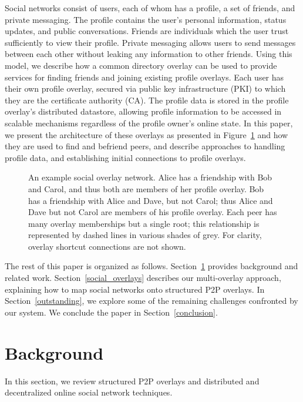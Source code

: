 \documentclass[letterpaper,twocolumn,10pt]{article}
\begin{document}
Social networks consist of users, each of whom has a profile, a set
of friends, and private messaging.  The profile contains the user's
personal information, status updates, and public conversations.  Friends are
individuals which the user trust sufficiently to view their profile.  Private
messaging allows users to send messages between each other without leaking any
information to other friends.  Using this model, we describe how a common
directory overlay can be used to provide services for finding friends and
joining existing profile overlays.  Each user has their own profile overlay,
secured via public key infrastructure (PKI) to which they are the certificate
authority (CA).  The profile data is stored in the profile overlay's distributed
datastore, allowing profile information to be accessed in scalable mechanisms
regardless of the profile owner's online state.  In this paper, we present
the architecture of these overlays as presented in Figure~\ref{fig:system} and
how they are used to find and befriend peers, and describe approaches to
handling profile data, and establishing initial connections to profile overlays.

\begin{figure}[ht]
\centering
{}
\caption{An example social overlay network.  Alice has a friendship with Bob and
Carol, and thus both are members of her profile overlay. Bob has a 
friendship with Alice and Dave, but not Carol; thus Alice and Dave but not Carol
are members of his profile overlay.  Each peer has many overlay memberships
but a single root; this relationship is represented by dashed lines in various
shades of grey.  For clarity, overlay shortcut connections are not shown.}
\label{fig:system}
\end{figure}

The rest of this paper is organized as follows.  Section~\ref{background}
provides background and related work.  Section~\ref{social_overlays} describes
our multi-overlay approach, explaining how to map social networks onto structured
P2P overlays.  In Section~\ref{outstanding}, we explore some of the remaining
challenges confronted by our system.  We conclude the paper in
Section~\ref{conclusion}.

\section{Background}
\label{background}
In this section, we review structured P2P overlays and distributed and
decentralized online social network techniques.
\end{document}
